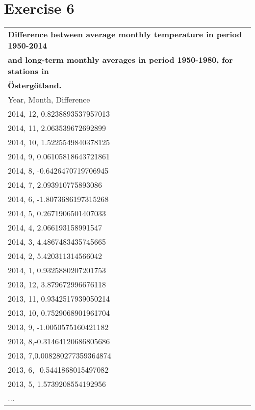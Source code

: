 \documentclass[a4paper,titlepage,12pt]{article}
\begin{document}
\section{Exercise 6}
\begin{tabular}{l}
  \bf Difference between average monthly temperature in period 1950-2014 \\
  \bf and long-term monthly averages in period 1950-1980, for stations in \\
  \bf Östergötland. \\ 
  Year, Month, Difference \\
  \hline
  2014,   12,  0.8238893537957013 \\ 
  2014,   11,   2.063539672692899 \\ 
  2014,   10,  1.5225549840378125 \\
  2014,    9, 0.06105818643721861 \\
  2014,    8, -0.6426470719706945 \\
  2014,    7,   2.093910775893086 \\
  2014,    6, -1.8073686197315268 \\
  2014,    5,  0.2671906501407033 \\
  2014,    4,   2.066193158991547 \\
  2014,    3,  4.4867483435745665 \\
  2014,    2,   5.420311314566042 \\
  2014,    1,  0.9325880207201753 \\
  2013,   12,   3.879672996676118 \\
  2013,   11,  0.9342517939050214 \\
  2013,   10,  0.7529068901961704 \\
  2013,    9, -1.0050575160421182 \\
  2013,    8,-0.31464120686805686 \\
  2013,    7,0.008280277359364874 \\
  2013,    6, -0.5441868015497082 \\
  2013,    5,  1.5739208554192956 \\
  ... \\





















  
\end{tabular}
\end{document}
